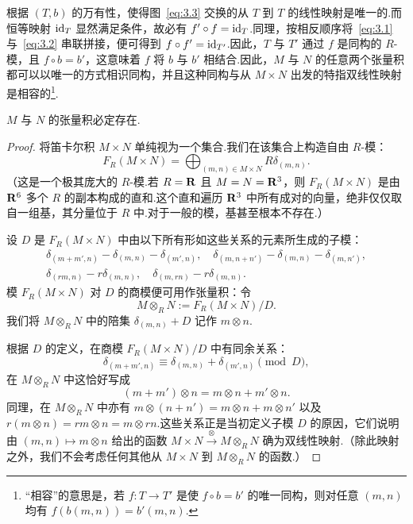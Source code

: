 根据 $(T, b)$ 的万有性，使得图~\eqref{eq:3.3} 交换的从 $T$ 到 $T$ 的线性映射是唯一的.而恒等映射 $\operatorname{id}_T$ 显然满足条件，故必有 $f' \circ f = \operatorname{id}_T$.同理，按相反顺序将~\eqref{eq:3.1} 与~\eqref{eq:3.2} 串联拼接，便可得到 $f \circ f' = \operatorname{id}_{T'}$.因此，$T$ 与 $T'$ 通过 $f$ 是同构的 $R$-模，且 $f \circ b = b'$，这意味着 $f$ 将 $b$ 与 $b'$ 相结合.因此，$M$ 与 $N$ 的任意两个张量积都可以以唯一的方式相识同构，并且这种同构与从 $M \times N$ 出发的特指双线性映射是相容的\footnote{``相容''的意思是，若 $f \colon T \to T'$ 是使 $f \circ b = b'$ 的唯一同构，则对任意 $(m, n)$ 均有 $f(b(m, n)) = b'(m, n)$.}.

\begin{theorem}\label{thm:tensor-exists}
$M$ 与 $N$ 的张量积必定存在.
\end{theorem}

\begin{proof}
将笛卡尔积 $M \times N$ 单纯视为一个集合.我们在该集合上构造自由 $R$-模：
\[
  F_R(M \times N) = \bigoplus_{(m, n) \in M \times N} R \delta_{(m, n)}.
\]
（这是一个极其庞大的 $R$-模.若 $R = \mathbf{R}$ 且 $M = N = \mathbf{R}^3$，则 $F_R(M \times N)$ 是由 $\mathbf{R}^6$ 多个 $R$ 的副本构成的直和.这个直和遍历 $\mathbf{R}^3$ 中所有成对的向量，绝非仅仅取自一组基，其分量位于 $R$ 中.对于一般的模，基甚至根本不存在.）

设 $D$ 是 $F_R(M \times N)$ 中由以下所有形如这些关系的元素所生成的子模：
\begin{gather*}
  \delta_{(m + m', n)} - \delta_{(m, n)} - \delta_{(m', n)}, \quad
  \delta_{(m, n + n')} - \delta_{(m, n)} - \delta_{(m, n')}, \\
  \delta_{(rm, n)} - r\delta_{(m, n)}, \quad
  \delta_{(m, rn)} - r\delta_{(m, n)}.
\end{gather*}
模 $F_R(M \times N)$ 对 $D$ 的商模便可用作张量积：令
\[
  M \otimes_R N := F_R(M \times N) / D.
\]
我们将 $M \otimes_R N$ 中的陪集 $\delta_{(m, n)} + D$ 记作 $m \otimes n$.

根据 $D$ 的定义，在商模 $F_R(M \times N) / D$ 中有同余关系：
\[
  \delta_{(m + m', n)} \equiv \delta_{(m, n)} + \delta_{(m', n)} \pmod D,
\]
在 $M \otimes_R N$ 中这恰好写成
\[
  (m + m') \otimes n = m \otimes n + m' \otimes n.
\]
同理，在 $M \otimes_R N$ 中亦有 $m \otimes (n + n') = m \otimes n + m \otimes n'$ 以及 $r(m \otimes n) = rm \otimes n = m \otimes rn$.这些关系正是当初定义子模 $D$ 的原因，它们说明由 $(m, n) \mapsto m \otimes n$ 给出的函数 $M \times N \xrightarrow{\otimes} M \otimes_R N$ 确为双线性映射.（除此映射之外，我们不会考虑任何其他从 $M \times N$ 到 $M \otimes_R N$ 的函数.）


\end{proof}
